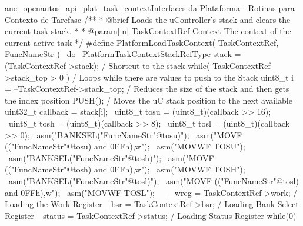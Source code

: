 \begin{algoritmo}{ane_openautos_api_plat_task_context}{Interfaces da Plataforma - Rotinas para Contexto de Tarefas}{c}
/**
* @brief Loads the uController's stack and clears the current task stack.
*
* @param[in] TaskContextRef Context The context of the current active task
*/
#define PlatformLoadTaskContext( TaskContextRef, FuncNameStr )                  \
do {                                                                            \
	PlatformTaskContextStackRefType stack = (TaskContextRef->stack);            \// Shortcut to the stack
	while( TaskContextRef->stack_top > 0 ) {                                    \// Loops while there are values to push to the Stack
		uint8_t i = --TaskContextRef->stack_top;                                \//     Reduces the size of the stack and then gets the index position
		PUSH();                                                                 \//     Moves the uC stack position to the next available
		uint32_t callback = stack[i];                                           \
		uint8_t tosu = (uint8_t)(callback >> 16);                               \
		uint8_t tosh = (uint8_t)(callback >>  8);                               \
		uint8_t tosl = (uint8_t)(callback >>  0);                               \
		asm("BANKSEL("FuncNameStr"@tosu)");                                     \
		asm("MOVF (("FuncNameStr"@tosu) and 0FFh),w");                          \
		asm("MOVWF TOSU");                                                      \
		asm("BANKSEL("FuncNameStr"@tosh)");                                     \
		asm("MOVF (("FuncNameStr"@tosh) and 0FFh),w");                          \
		asm("MOVWF TOSH");                                                      \
		asm("BANKSEL("FuncNameStr"@tosl)");                                     \
		asm("MOVF (("FuncNameStr"@tosl) and 0FFh),w");                          \
		asm("MOVWF TOSL");                                                      \
	}                                                                           \
	_wreg = TaskContextRef->work;                                               \// Loading the Work Register
	_bsr = TaskContextRef->bsr;                                                 \// Loading Bank Select Register
	_status = TaskContextRef->status;                                           \// Loading Status Register
} while(0)
\end{algoritmo}
